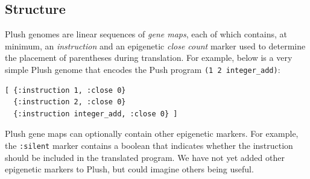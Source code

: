 \documentclass[graybox]{svmult}
\begin{document}

\subsection{Structure}
Plush genomes are linear sequences of \textit{gene maps}, each of which contains, at minimum, an \textit{instruction} and an epigenetic \textit{close count} marker used to determine the placement of parentheses during translation.
For example, below is a very simple Plush genome that encodes the Push program \texttt{(1 2 integer\_add)}:
\begin{verbatim}
[ {:instruction 1, :close 0}
  {:instruction 2, :close 0}
  {:instruction integer_add, :close 0} ]
\end{verbatim}
Plush gene maps can optionally contain other epigenetic markers. For example, the \texttt{:silent} marker contains a boolean that indicates whether the instruction should be included in the translated program. We have not yet added other epigenetic markers to Plush, but could imagine others being useful.
\end{document}
